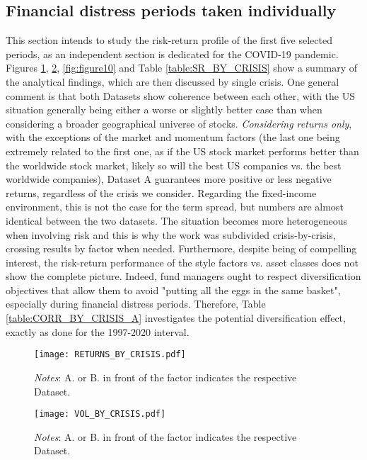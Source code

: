 \documentclass[12pt]{article}
\begin{document}
\subsection{Financial distress periods taken individually}
This section intends to study the risk-return profile of the first five selected periods, as an independent section is dedicated for the COVID-19 pandemic. Figures \ref{fig:figure8}, \ref{fig:figure9}, \ref{fig:figure10} and Table \ref{table:SR_BY_CRISIS} show a summary of the analytical findings, which are then discussed by single crisis. One general comment is that both Datasets show coherence between each other, with the US situation generally being either a worse or slightly better case than when considering a broader geographical universe of stocks. \textit{Considering returns only}, with the exceptions of the market and momentum factors (the last one being extremely related to the first one, as if the US stock market performs better than the worldwide stock market, likely so will the best US companies vs. the best worldwide companies), Dataset A guarantees more positive or less negative returns, regardless of the crisis we consider. Regarding the fixed-income environment, this is not the case for the term spread, but numbers are almost identical between the two datasets. The situation becomes more heterogeneous when involving risk and this is why the work was subdivided crisis-by-crisis, crossing results by factor when needed. Furthermore, despite being of compelling interest, the risk-return performance of the style factors vs. asset classes does not show the complete picture. Indeed, fund managers ought to respect diversification objectives that allow them to avoid "putting all the eggs in the same basket", especially during financial distress periods. Therefore, Table \ref{table:CORR_BY_CRISIS_A} investigates the potential diversification effect, exactly as done for the 1997-2020 interval.\\

\begin{figure}[H]
\centering
\begin{minipage}[b]{\textwidth}
\centering
{}
\texttt{[image: RETURNS\_BY\_CRISIS.pdf]}
\caption*{\textit{Notes}: A. or B. in front of the factor indicates the respective Dataset.}
\label{fig:figure8}
\end{minipage}%
\end{figure}

\begin{figure}[H]
\centering
\begin{minipage}[b]{\textwidth}
\centering
{}
\texttt{[image: VOL\_BY\_CRISIS.pdf]}
\caption*{\textit{Notes}: A. or B. in front of the factor indicates the respective Dataset.}
\label{fig:figure9}
\end{minipage}%
\end{figure}
\end{document}
